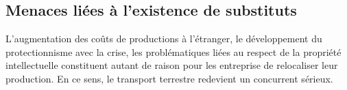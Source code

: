 \subsection{Menaces liées à l'existence de substituts}

L'augmentation des coûts de productions à l'étranger, le développement du protectionnisme avec la crise, les problématiques liées au respect de la propriété intellectuelle constituent autant de raison pour les entreprise de relocaliser leur production. En ce sens, le transport terrestre redevient un concurrent sérieux. 

